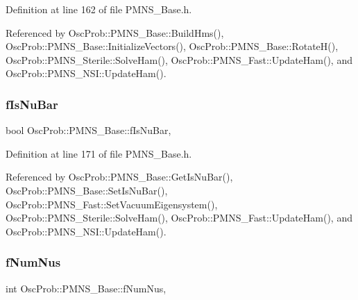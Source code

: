 Definition at line 162 of file P\+M\+N\+S\+\_\+\+Base.\+h.



Referenced by Osc\+Prob\+::\+P\+M\+N\+S\+\_\+\+Base\+::\+Build\+Hms(), Osc\+Prob\+::\+P\+M\+N\+S\+\_\+\+Base\+::\+Initialize\+Vectors(), Osc\+Prob\+::\+P\+M\+N\+S\+\_\+\+Base\+::\+Rotate\+H(), Osc\+Prob\+::\+P\+M\+N\+S\+\_\+\+Sterile\+::\+Solve\+Ham(), Osc\+Prob\+::\+P\+M\+N\+S\+\_\+\+Fast\+::\+Update\+Ham(), and Osc\+Prob\+::\+P\+M\+N\+S\+\_\+\+N\+S\+I\+::\+Update\+Ham().

\mbox{\label{classOscProb_1_1PMNS__Base_a0ebaeaefab36a3ff381c6293faedfdd6}} 
\subsubsection{\texorpdfstring{f\+Is\+Nu\+Bar}{fIsNuBar}}
{\footnotesize\ttfamily bool Osc\+Prob\+::\+P\+M\+N\+S\+\_\+\+Base\+::f\+Is\+Nu\+Bar\hspace{0.3cm}{\ttfamily [protected]}, {\ttfamily [inherited]}}



Definition at line 171 of file P\+M\+N\+S\+\_\+\+Base.\+h.



Referenced by Osc\+Prob\+::\+P\+M\+N\+S\+\_\+\+Base\+::\+Get\+Is\+Nu\+Bar(), Osc\+Prob\+::\+P\+M\+N\+S\+\_\+\+Base\+::\+Set\+Is\+Nu\+Bar(), Osc\+Prob\+::\+P\+M\+N\+S\+\_\+\+Fast\+::\+Set\+Vacuum\+Eigensystem(), Osc\+Prob\+::\+P\+M\+N\+S\+\_\+\+Sterile\+::\+Solve\+Ham(), Osc\+Prob\+::\+P\+M\+N\+S\+\_\+\+Fast\+::\+Update\+Ham(), and Osc\+Prob\+::\+P\+M\+N\+S\+\_\+\+N\+S\+I\+::\+Update\+Ham().

\mbox{\label{classOscProb_1_1PMNS__Base_a24bb74bed63569dfe88b18fa6a08060e}} 
\subsubsection{\texorpdfstring{f\+Num\+Nus}{fNumNus}}
{\footnotesize\ttfamily int Osc\+Prob\+::\+P\+M\+N\+S\+\_\+\+Base\+::f\+Num\+Nus\hspace{0.3cm}{\ttfamily [protected]}, {\ttfamily [inherited]}}



